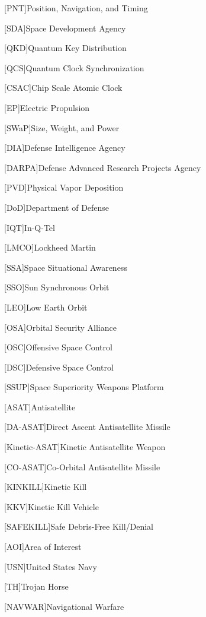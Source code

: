 [PNT]{Position, Navigation, and Timing}

[SDA]{Space Development Agency}

[QKD]{Quantum Key Distribution}

[QCS]{Quantum Clock Synchronization}

[CSAC]{Chip Scale Atomic Clock}

[EP]{Electric Propulsion}

[SWaP]{Size, Weight, and Power}

[DIA]{Defense Intelligence Agency}

[DARPA]{Defense Advanced Research Projects Agency}

[PVD]{Physical Vapor Deposition}

[DoD]{Department of Defense}

[IQT]{In-Q-Tel}

[LMCO]{Lockheed Martin}

[SSA]{Space Situational Awareness}

[SSO]{Sun Synchronous Orbit}

[LEO]{Low Earth Orbit}

[OSA]{Orbital Security Alliance}

[OSC]{Offensive Space Control}

[DSC]{Defensive Space Control}

[SSUP]{Space Superiority Weapons Platform}

[ASAT]{Antisatellite}

[DA-ASAT]{Direct Ascent Antisatellite Missile}

[Kinetic-ASAT]{Kinetic Antisatellite Weapon}

[CO-ASAT]{Co-Orbital Antisatellite Missile}

[KINKILL]{Kinetic Kill}

[KKV]{Kinetic Kill Vehicle}

[SAFEKILL]{Safe Debris-Free Kill/Denial}

[AOI]{Area of Interest}

[USN]{United States Navy}

[TH]{Trojan Horse}

[NAVWAR]{Navigational Warfare}

